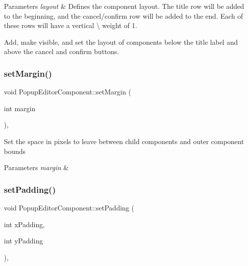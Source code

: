 \begin{DoxyParams}{Parameters}
{\em layout} & Defines the component layout. The title row will be added to the beginning, and the cancel/confirm row will be added to the end. Each of these rows will have a vertical \textbackslash{} weight of 1.\\
\hline
\end{DoxyParams}
Add, make visible, and set the layout of components below the title label and above the cancel and confirm buttons. \mbox{\label{classPopupEditorComponent_abf084b41df7439e868ae5fbfb795ed3d}} 
\subsubsection{\texorpdfstring{set\+Margin()}{setMargin()}}
{\footnotesize\ttfamily void Popup\+Editor\+Component\+::set\+Margin (\begin{DoxyParamCaption}\item[{int}]{margin }\end{DoxyParamCaption})\hspace{0.3cm}{\ttfamily [inline]}, {\ttfamily [protected]}}

Set the space in pixels to leave between child components and outer component bounds


\begin{DoxyParams}{Parameters}
{\em margin} & \\
\hline
\end{DoxyParams}
\mbox{\label{classPopupEditorComponent_a1c97591f083cf00297a141b35d75dac3}} 
\subsubsection{\texorpdfstring{set\+Padding()}{setPadding()}}
{\footnotesize\ttfamily void Popup\+Editor\+Component\+::set\+Padding (\begin{DoxyParamCaption}\item[{int}]{x\+Padding,  }\item[{int}]{y\+Padding }\end{DoxyParamCaption})\hspace{0.3cm}{\ttfamily [inline]}, {\ttfamily [protected]}}

